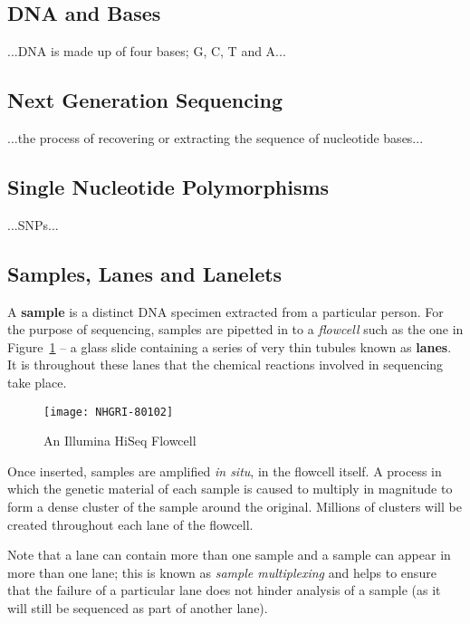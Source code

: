 \subsection{DNA and Bases}

...DNA is made up of four bases; G, C, T and A...

\subsection{Next Generation Sequencing}

...the process of recovering or extracting the sequence of nucleotide bases...

\subsection{Single Nucleotide Polymorphisms}

...SNPs...

\subsection{Samples, Lanes and Lanelets}
\label{chap:samplelanelanelets}

A \textbf{sample} is a distinct DNA specimen extracted from a particular person.
For the purpose of sequencing, samples are pipetted in to a \textit{flowcell}
such as the one in Figure~\ref{fig:flowcell} -- a glass slide
containing a series of very thin tubules known as \textbf{lanes}.  It is
throughout these lanes that the chemical reactions involved in sequencing take place.

\begin{figure}[htbp!]
    \centering
    \texttt{[image: NHGRI-80102]}
    \caption[flowcell]{An Illumina HiSeq Flowcell\citep{img:flowcell}}
    \label{fig:flowcell}
\end{figure}

Once inserted, samples are amplified \textit{in situ}, in the flowcell itself. A
process in which the genetic material of each sample is caused to multiply in
magnitude to form a dense cluster of the sample around the original. Millions of
clusters will be created throughout each lane of the flowcell.

Note that a lane can contain more than one sample and a sample can appear in
more than one lane; this is known as \textit{sample multiplexing} and helps to
ensure that the failure of a particular lane does not hinder analysis of a
sample (as it will still be sequenced as part of another lane).

